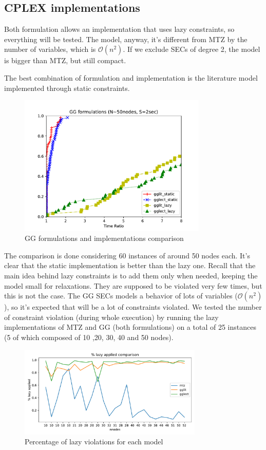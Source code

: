 \subsection{CPLEX implementations}
Both formulation allows an implementation that uses lazy constraints, so
everything will be tested. The model, anyway, it's different from MTZ by the
number of variables, which is $\mathcal{O}(n^2)$. If we exclude
SECs of degree 2, the model is bigger than MTZ, but still compact.

\begin{claim} 
    The best combination of formulation and implementation is the literature
    model implemented through static constraints. 
\end{claim}

\begin{figure}[h]
    \centering
    \includegraphics[width=0.8\textwidth]{figures/gg_comp1}
    \caption{GG formulations and implementations comparison}
\end{figure}

The comparison is done considering 60 instances of around 50 nodes each. It's
clear that the static implementation is better than the lazy one. Recall that
the main idea behind lazy constraints is to add them only when needed, keeping
the model small for relaxations. They are supposed to be violated very few
times, but this is not the case. The GG SECs models a behavior of lots of
variables ($\mathcal{O}(n^2)$), so it's expected that will be a lot of
constraints violated. We tested the number of constraint violation (during whole
execution) by running the lazy implementations of MTZ and GG (both formulations)
on a total of 25 instances (5 of which composed of 10 ,20, 30, 40 and 50
nodes).

\begin{figure}[h]
    \centering
    \includegraphics[width=0.78\textwidth]{figures/perc_lazy}
    \caption{Percentage of lazy violations for each model}
\end{figure}

